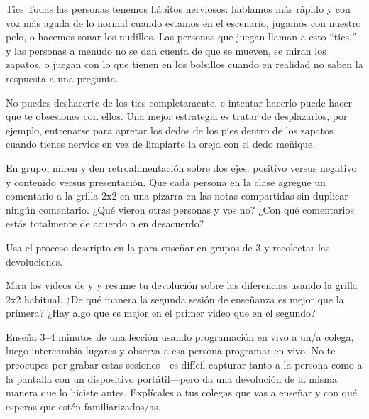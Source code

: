 \begin{aside}{Tics}
  Todas las personas tenemos hábitos nerviosos:
  hablamos más rápido y con voz más aguda de lo normal cuando estamos en el escenario,
  jugamos con nuestro pelo,
  o hacemos sonar los nudillos.
  Las personas que juegan llaman a esto ``tics,''
  y las personas a menudo no se dan cuenta de que se mueven,
  se miran los zapatos,
  o juegan con lo que tienen en los bolsillos
  cuando en realidad no saben la respuesta a una pregunta.

  No puedes deshacerte de los tics completamente,
  e intentar hacerlo puede hacer que te obsesiones con ellos.
  Una mejor estrategia es tratar de desplazarlos, por ejemplo,
  entrenarse para apretar los dedos de los pies dentro de los zapatos cuando tienes nervios
  en vez de limpiarte la oreja con el dedo meñique.
\end{aside}



En grupo,
miren 
y den retroalimentación sobre dos ejes:
positivo versus negativo y contenido versus presentación.
Que cada persona en la clase agregue un comentario a la grilla 2x2 en una pizarra en las notas compartidas
sin duplicar ningún comentario.
¿Qué vieron otras personas y vos no?
¿Con qué comentarios estás totalmente de acuerdo o en desacuerdo?


Usa el proceso descripto en la 
para enseñar en grupos de 3 y recolectar las devoluciones.


Mira los videos de 
y 
y resume tu devolución sobre las diferencias usando la grilla 2x2 habitual.
¿De qué manera la segunda sesión de enseñanza es mejor que la primera?
¿Hay algo que es mejor en el primer video que en el segundo?


Enseña 3--4 minutos de una lección usando programación en vivo a un/a colega,
luego intercambia lugares y observa a esa persona programar en vivo.
No te preocupes por grabar estas sesiones---es difícil capturar tanto a la persona como a la pantalla con un dispositivo portátil---pero
da una devolución de la misma manera que lo hiciste antes.
Explícales a tus colegas que vas a enseñar y con qué esperas que estén familiarizados/as.

